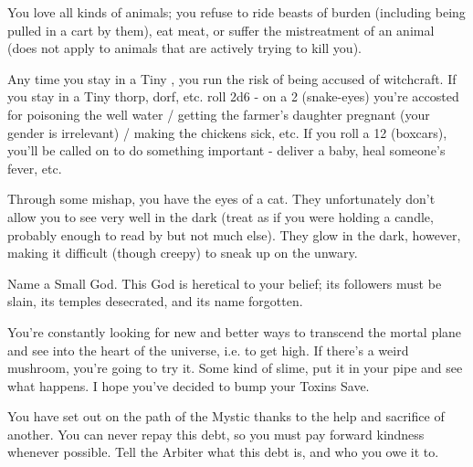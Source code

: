 \begin{multicols*}{2}
    \begin{center}
    \end{center}


  You love all kinds of animals; you refuse to ride beasts of burden (including being pulled in a cart by them), eat meat, or suffer the mistreatment of an animal (does not apply to animals that are actively trying to kill you).

  
  Any time you stay in a Tiny , you run the risk of being accused of witchcraft. If you stay in a Tiny thorp, dorf, etc. roll 2d6 - on a 2 (snake-eyes) you're accosted for poisoning the well water / getting the farmer's daughter pregnant (your gender is irrelevant) / making the chickens sick, etc. If you roll a 12 (boxcars), you'll be called on to do something important - deliver a baby, heal someone's fever, etc.


  Through some mishap, you have the eyes of a cat. They unfortunately don't allow you to see very well in the dark (treat as if you were holding a candle, probably enough to read by but not much else). They glow in the dark, however, making it difficult (though creepy) to sneak up on the unwary.


  Name a Small God. This God is heretical to your belief; its followers must be slain, its temples desecrated, and its name forgotten.

\cbreak


  You're constantly looking for new and better ways to transcend the mortal plane and see into the heart of the universe, i.e. to get high. If there's a weird mushroom, you're going to try it. Some kind of slime, put it in your pipe and see what happens. I hope you've decided to bump your Toxins Save.


  You have set out on the path of the Mystic thanks to the help and sacrifice of another. You can never repay this debt, so you must pay forward kindness whenever possible. Tell the Arbiter what this debt is, and who you owe it to.


\end{multicols*}
